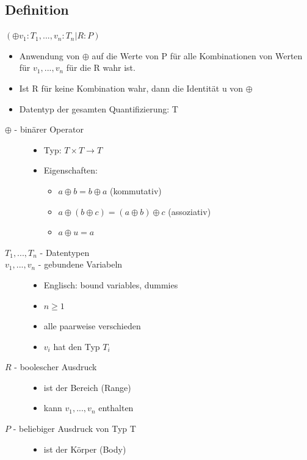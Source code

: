 \documentclass[a4paper,10pt]{article}
\newcommand{\ra}{\rightarrow}
\begin{document}
\subsection{Definition}
$(\oplus v_1:T_1, ..., v_n:T_n|R:P)$
\begin{itemize}
	\item Anwendung von $\oplus$ auf die Werte von P f\"ur alle Kombinationen von Werten f\"ur $v_1, ..., v_n$ f\"ur die R wahr ist.
	\item Ist R f\"ur keine Kombination wahr, dann die Identit\"at u von $\oplus$
	\item Datentyp der gesamten Quantifizierung: T
\end{itemize}
\begin{description}
\item[$\oplus$ - bin\"arer Operator] \hfill
	\begin{itemize}
		\item Typ: $T \times T \ra T$
		\item Eigenschaften: 
		\begin{itemize} 
  			\item $a \oplus b = b \oplus a$ (kommutativ)  
			\item $a \oplus (b \oplus c) = (a \oplus b) \oplus c$ (assoziativ)
			\item $a \oplus u = a$  
		\end{itemize}
	\end{itemize}
\item[$T_1, ...,T_n$ - Datentypen] 
\item[$v_1, ...,v_n$ - gebundene Variabeln] \hfill
	\begin{itemize}
		\item Englisch: bound variables, dummies
		\item $n \geq 1$
		\item alle paarweise verschieden
		\item $v_i$ hat den Typ $T_i$
	\end{itemize}
\item[$R$ - boolescher Ausdruck] \hfill
	\begin{itemize}
		\item ist der Bereich (Range)
		\item kann $v_1, ..., v_n$ enthalten
	\end{itemize}
\item[$P$ - beliebiger Ausdruck von Typ T] \hfill
	\begin{itemize}
		\item ist der K\"orper (Body)

\end{itemize}
\end{description}
\end{document}
